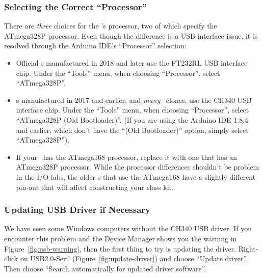 \subsubsection{Selecting the Correct ``Processor''}\label{sec:processor-selection}

There are \textit{three} choices for the \nano{}'s processor, two of which
specify the ATmega328P processor. Even though the difference is a USB
interface issue, it is resolved through the Arduino IDE's ``Processor''
selection:

\begin{itemize}
\item Official \nano{}s manufactured in 2018 and later use the FT232RL USB
    interface chip. Under the ``Tools'' menu, when choosing ``Processor'',
    select ``ATmega328P''.
\item \nano{}s manufactured in 2017 and earlier, and \textit{many} \nano\
    clones, use the CH340 USB interface chip. Under the ``Tools'' menu, when
    choosing ``Processor'', select ``ATmega328P (Old Bootloader)''. (If you are
    using the Arduino IDE 1.8.4 and earlier, which don't have the ``(Old
    Bootloader)'' option, simply select ``ATmega328P'').
\item If your \nano\ has the ATmega168 processor, replace it with one that has
    an ATmega328P processor. While the processor differences shouldn't be
    problem in the I/O labs, the older \nano{}s that use the ATmega168 have a
    slightly different pin-out that will affect constructing your class kit.
\end{itemize}

\subsubsection{Updating USB Driver if Necessary}

We have seen some Windows computers without the CH340 USB driver. If you
encounter this problem and the Device Manager shows you the warning in
Figure~\ref{fig:usb-warning}, then the first thing to try is updating the
driver. Right-click on USB2.0-Seri! (Figure~\ref{fig:update-driver}) and choose
``Update driver''. Then choose ``Search automatically for updated driver
software''.

